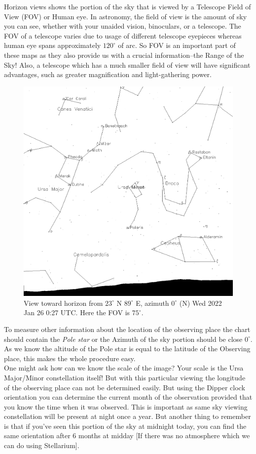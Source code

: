 \documentclass[a4paper,12pt]{extarticle}
\begin{document}
Horizon views shows the portion of the sky that is viewed by a Telescope Field of View (FOV) or Human eye. In astronomy, the field of view is the amount of sky you can see, whether with your unaided vision, binoculars, or a telescope. The FOV of a telescope varies due to usage of different telescope eyepieces whereas human eye spans approximately $120^\circ$ of arc. So FOV is an important part of these maps as they also provide us with a crucial information--the Range of the Sky! Also, a telescope which has a much smaller field of view will have significant advantages, such as greater magnification and light-gathering power. 
\begin{figure}[H]
    \centering
    \includegraphics[width=0.6\linewidth]{Hor_1.png}
    \caption{View toward horizon from $23^\circ$ N $89^\circ$ E, azimuth $0^\circ$ (N) Wed 2022 Jan 26 0:27 UTC. Here the FOV is $75^\circ$.}
\end{figure}

To measure other information about the location of the observing place the chart should contain the \textit{Pole star} or the Azimuth of the sky portion should be close $0^\circ$. As we know the altitude of the Pole star is equal to the latitude of the Observing place, this makes the whole procedure easy. \\

One might ask how can we know the scale of the image? Your scale is the Ursa Major/Minor constellation itself! But with this particular viewing the longitude of the observing place can not be determined easily. But using the Dipper clock orientation you can determine the current month of the observation provided that you know the time when it was observed. This is important as same sky viewing constellation will be present at night once a year. But another thing to remember is that if you've seen this portion of the sky at midnight today, you can find the same orientation after 6 months at midday [If there was no atmosphere which we can do using Stellarium].\\
\end{document}
